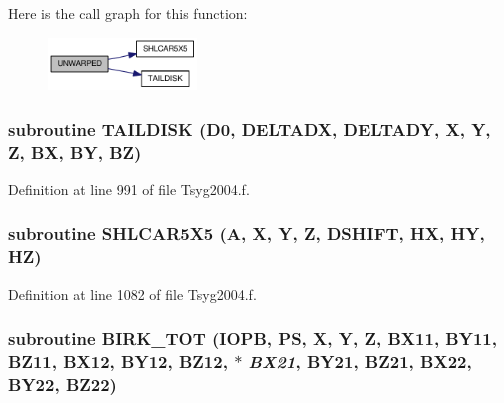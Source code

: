 Here is the call graph for this function:\nopagebreak
\begin{figure}[H]
\begin{center}
\leavevmode
\includegraphics[width=112pt]{_tsyg2004_8f_08d1be0e49f67539068d7f8dd74b4b9e_cgraph}
\end{center}
\end{figure}
\hypertarget{_tsyg2004_8f_23e0bc0f4d505d14f49527e132c8d7e3}{
\subsubsection[{TAILDISK}]{\setlength{\rightskip}{0pt plus 5cm}subroutine TAILDISK (D0, \/  DELTADX, \/  DELTADY, \/  X, \/  Y, \/  Z, \/  BX, \/  BY, \/  BZ)}}
\label{_tsyg2004_8f_23e0bc0f4d505d14f49527e132c8d7e3}




Definition at line 991 of file Tsyg2004.f.\hypertarget{_tsyg2004_8f_46ca699b5ea2961face078efbaa5da64}{
\subsubsection[{SHLCAR5X5}]{\setlength{\rightskip}{0pt plus 5cm}subroutine SHLCAR5X5 (A, \/  X, \/  Y, \/  Z, \/  DSHIFT, \/  HX, \/  HY, \/  HZ)}}
\label{_tsyg2004_8f_46ca699b5ea2961face078efbaa5da64}




Definition at line 1082 of file Tsyg2004.f.\hypertarget{_tsyg2004_8f_eb6fb8bb0214fdedda1df2ef2336c3fe}{
\subsubsection[{BIRK\_\-TOT}]{\setlength{\rightskip}{0pt plus 5cm}subroutine BIRK\_\-TOT (IOPB, \/  PS, \/  X, \/  Y, \/  Z, \/  BX11, \/  BY11, \/  BZ11, \/  BX12, \/  BY12, \/  BZ12, \/  $\ast$ {\em BX21}, \/  BY21, \/  BZ21, \/  BX22, \/  BY22, \/  BZ22)}}
\label{_tsyg2004_8f_eb6fb8bb0214fdedda1df2ef2336c3fe}




